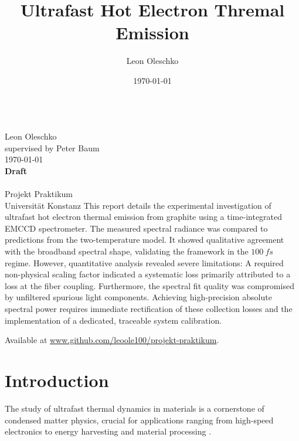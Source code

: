 \documentclass[
	a4paper,
]{scrarticle}
\begin{document}
\author{Leon Oleschko}
\date{\dotdate\today}

\begin{titlepage}
    \sffamily
    \vspace*{3cm}
    {
        \fontsize{32}{32}
        \title{Ultrafast Hot Electron Thremal Emission}
    }
    \vspace{.25cm}\\
    {
        \Large
        Leon Oleschko\\
        supervised by Peter Baum
        \vspace{.05cm}\\
        \dotdate\today\\
        \textbf{Draft}\\
        \vspace{.05cm}\\
        \normalsize
        Projekt Praktikum\\
        Universität Konstanz
    }
    \vfill
    {
        \normalfont\normalsize
        This report details the experimental investigation of ultrafast hot electron thermal emission from graphite using a time-integrated EMCCD spectrometer. The measured spectral radiance was compared to predictions from the two-temperature model. It showed qualitative agreement with the broadband spectral shape, validating the framework in the $\SI{100}{fs}$ regime. 
        However, quantitative analysis revealed severe limitations: A required non-physical scaling factor indicated a systematic loss primarily attributed to a loss at the fiber coupling. 
        Furthermore, the spectral fit quality was compromised by unfiltered spurious light components. 
        Achieving high-precision absolute spectral power requires immediate rectification of these collection losses and the implementation of a dedicated, traceable system calibration.
    }
    \vfill
    \begin{flushright}
        Available at \url{www.github.com/leoole100/projekt-praktikum}.
    \end{flushright}
\end{titlepage}


\clearpage

\section{Introduction}
The study of ultrafast thermal dynamics in materials is a cornerstone of condensed matter physics, crucial for applications ranging from high-speed electronics to energy harvesting and material processing \cite{kampfrathStronglyCoupledOptical2005,vicarelliGrapheneFieldeffectTransistors2012,tangPlasmonicHotElectrons2020,konigHotCarrierSolar2010}. 
\end{document}
